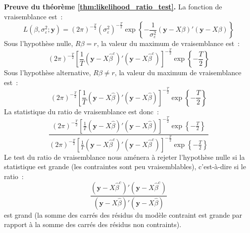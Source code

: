 \documentclass[10pt]{beamer}
\theoremstyle{plain}
\begin{document}
\begin{notes}

  \textbf{Preuve du théorème \ref{thm:likelihood_ratio_test}.} La fonction de vraisemblance est~:
  \[
    L\left(\beta, \sigma_{\varepsilon}^2;\mathbf y\right) = (2\pi)^{-\frac{T}{2}}\left(\sigma_{\varepsilon}^2\right)^{-\frac{T}{2}}\exp\left\{ -\frac{1}{\sigma_{\varepsilon}^2}\left( \mathbf y - X\beta \right)'\left( \mathbf y - X\beta \right) \right\}
  \]
  Sous l'hypothèse nulle, $R\beta=r$, la valeur du maximum de vraisemblance est~:
  \[
    (2\pi)^{-\frac{T}{2}}\left[ \frac{1}{T}\left(\mathbf y - X\hat\beta^c \right)'\left( \mathbf y - X\hat\beta^c \right) \right]^{-\frac{T}{2}}\exp\left\{-\frac{T}{2}\right\}
  \]
  Sous l'hypothèse alternative, $R\beta\neq r$, la valeur du maximum de vraisemblance est~:
\[
    (2\pi)^{-\frac{T}{2}}\left[ \frac{1}{T}\left(\mathbf y - X\hat\beta \right)'\left( \mathbf y - X\hat\beta \right) \right]^{-\frac{T}{2}}\exp\left\{-\frac{T}{2}\right\}
  \]
  La statistique du ratio de vraisemblance est donc~:
  \[
    \frac{(2\pi)^{-\frac{T}{2}}\left[ \frac{1}{T}\left(\mathbf y - X\hat\beta \right)'\left( \mathbf y - X\hat\beta \right) \right]^{-\frac{T}{2}}\exp\left\{-\frac{T}{2}\right\}}{(2\pi)^{-\frac{T}{2}}\left[ \frac{1}{T}\left(\mathbf y - X\hat\beta^c \right)'\left( \mathbf y - X\hat\beta^c \right) \right]^{-\frac{T}{2}}\exp\left\{-\frac{T}{2}\right\}}
  \]
  Le test du ratio de vraisemblance nous aménera à rejeter l'hypothèse nulle si la statistique est grande (les contraintes sont peu vraisemblables), c'est-à-dire si le ratio~:
  \[
    \frac{\left(\mathbf y - X\hat\beta^c \right)'\left( \mathbf y - X\hat\beta^c \right)}{\left(\mathbf y - X\hat\beta\right)'\left( \mathbf y - X\hat\beta\right)}
  \]
  est grand (la somme des carrés des résidus du modèle contraint est grande par rapport à la somme des carrés des résidus non contraints).\newline


\end{notes}
\end{document}
